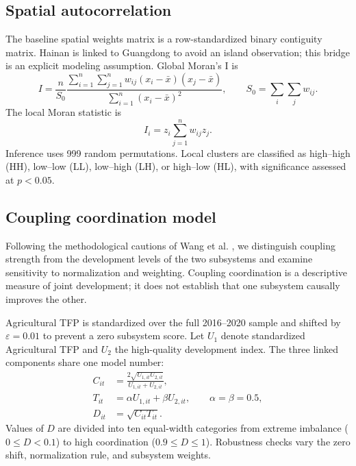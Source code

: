 \documentclass[sustainability,article,submit,moreauthors]{Definitions/mdpi}
\numberwithin{equation}{section}
\begin{document}
\subsection{Spatial autocorrelation}

The baseline spatial weights matrix is a row-standardized binary contiguity matrix. Hainan is linked to Guangdong to avoid an island observation; this bridge is an explicit modeling assumption. Global Moran's I is
\begin{equation}
I=\frac{n}{S_0}\frac{\sum_{i=1}^{n}\sum_{j=1}^{n}w_{ij}(x_i-\bar x)(x_j-\bar x)}{\sum_{i=1}^{n}(x_i-\bar x)^2},
\qquad S_0=\sum_i\sum_jw_{ij}.
\label{eq:globalmoran}
\end{equation}
The local Moran statistic is
\begin{equation}
I_i=z_i\sum_{j=1}^{n}w_{ij}z_j.
\label{eq:localmoran}
\end{equation}
Inference uses 999 random permutations. Local clusters are classified as high--high (HH), low--low (LL), low--high (LH), or high--low (HL), with significance assessed at $p<0.05$.

\subsection{Coupling coordination model}

Following the methodological cautions of Wang et al. \cite{wang2021},
we distinguish coupling strength from the development levels of the
two subsystems and examine sensitivity to normalization and weighting.
Coupling coordination is a descriptive measure of joint development;
it does not establish that one subsystem causally improves the other.

Agricultural TFP is standardized over the full 2016--2020 sample and shifted by $\varepsilon=0.01$ to prevent a zero subsystem score. Let $U_1$ denote standardized Agricultural TFP and $U_2$ the high-quality development index. The three linked components share one model number:
\begin{equation}
\begin{aligned}
C_{it}&=\frac{2\sqrt{U_{1,it}U_{2,it}}}{U_{1,it}+U_{2,it}},\\
T_{it}&=\alpha U_{1,it}+\beta U_{2,it},\qquad \alpha=\beta=0.5,\\
D_{it}&=\sqrt{C_{it}T_{it}}.
\end{aligned}
\label{eq:ccd}
\end{equation}
Values of $D$ are divided into ten equal-width categories from extreme imbalance ($0\le D<0.1$) to high coordination ($0.9\le D\le 1$). Robustness checks vary the zero shift, normalization rule, and subsystem weights.
\end{document}
